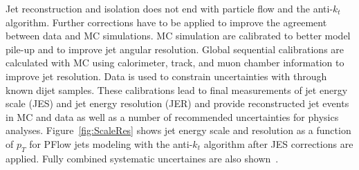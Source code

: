 Jet reconstruction and isolation does not end with particle flow and the anti-$k_t$ algorithm. Further corrections have to be applied to improve the agreement between data and MC simulations. MC simulation are calibrated to better model pile-up and to improve jet angular resolution. Global sequential calibrations are calculated with MC using calorimeter, track, and muon chamber information to improve jet resolution. Data is used to constrain uncertainties with through known dijet samples. These calibrations lead to final measurements of jet energy scale (JES) and jet energy resolution (JER) and provide reconstructed jet events in MC and data as well as a number of recommended uncertainties for physics analyses.  Figure~\ref{fig:ScaleRes} shows jet energy scale and resolution as a function of $p_T$ for PFlow jets modeling with the anti-$k_t$ algorithm after JES corrections are applied. Fully combined systematic uncertaines are also shown~\cite{jetscaleres}.
